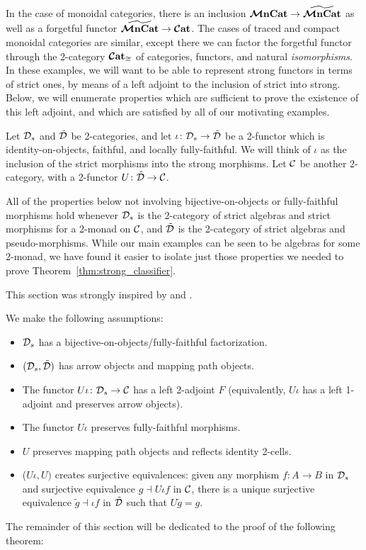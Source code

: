 \documentclass[11pt,oneside,article]{memoir}
\begin{document}
In the case of monoidal categories, there is an inclusion $\bm{\mathcal{M}}\mathbf{nCat}\to\widetilde{\bm{\mathcal{M}}\mathbf{nCat}}$ as well as a
forgetful functor $\widetilde{\bm{\mathcal{M}}\mathbf{nCat}}\to\bm{\mathcal{C}}\mathbf{at}$. The cases of traced and compact monoidal categories are
similar, except there we can factor the forgetful functor through the 2-category $\bm{\mathcal{C}}\mathbf{at}_{\cong}$ of
categories, functors, and natural \emph{isomorphisms}. In these examples, we will want to be able to
represent strong functors in terms of strict ones, by means of a left adjoint to the inclusion of
strict into strong. Below, we will enumerate properties which are sufficient to prove the existence
of this left adjoint, and which are satisfied by all of our motivating examples.

Let $\mathcal{D}_s$ and $\tilde{\mathcal{D}}$ be 2-categories, and let $\iota\colon\mathcal{D}_s\to\tilde{\mathcal{D}}$ be a
2-functor which is identity-on-objects, faithful, and locally fully-faithful. We will think of
$\iota$ as the inclusion of the strict morphisms into the strong morphisms. Let $\mathcal{C}$ be
another 2-category, with a 2-functor $U\colon\tilde{\mathcal{D}}\to\mathcal{C}$.

\begin{remark}
   All of the properties below not involving bijective-on-objects or fully-faithful morphisms hold
   whenever $\mathcal{D}_s$ is the 2-category of strict algebras and strict morphisms for a 2-monad on
   $\mathcal{C}$, and $\tilde{\mathcal{D}}$ is the 2-category of strict algebras and pseudo-morphisms. While our
   main examples can be seen to be algebras for some 2-monad, we have found it easier to isolate
   just those properties we needed to prove Theorem~\ref{thm:strong_classifier}.

   This section was strongly inspired by \cite{Bourke} and \cite{LackHomotopy}.
\end{remark}

We make the following assumptions:
\begin{itemize}
   \item $\mathcal{D}_s$ has a bijective-on-objects/fully-faithful factorization.
   \item $(\mathcal{D}_s,\tilde{\mathcal{D}})$ has arrow objects and mapping path objects.
   \item The functor $U\iota\colon\mathcal{D}_s\to\mathcal{C}$ has a left 2-adjoint $F$ (equivalently,
   $U\iota$ has a left 1-adjoint and preserves arrow objects).
   \item The functor $U\iota$ preserves fully-faithful morphisms.
   \item $U$ preserves mapping path objects and reflects identity 2-cells.
   \item ($U\iota,U)$ creates surjective equivalences: given any morphism $f\colon A\to B$ in
   $\mathcal{D}_s$ and surjective equivalence $g\dashv U\iota f$ in $\mathcal{C}$, there is a unique
   surjective equivalence $\tilde{g}\dashv\iota f$ in $\tilde{\mathcal{D}}$ such that $U\tilde{g}=g$.
\end{itemize}
The remainder of this section will be dedicated to the proof of the following theorem:
\end{document}
